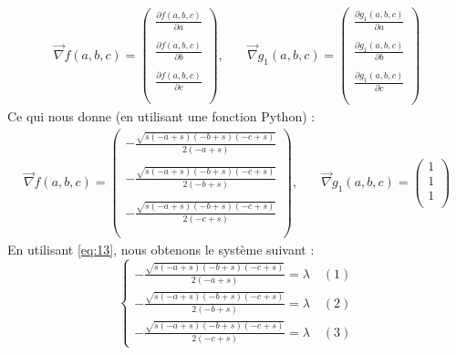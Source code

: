 \documentclass[12pt]{report}
\begin{document}
\begin{align*}
\overrightarrow{\nabla}f(a,b,c) = 
\left(\begin{matrix}
\frac{\partial f(a,b,c)}{\partial a} \\ \\
\frac{\partial f(a,b,c)}{\partial b} \\ \\
\frac{\partial f(a,b,c)}{\partial c} \\ \\
\end{matrix}\right),\quad          &  \overrightarrow{\nabla}g_{1}(a,b,c) = 
\left(\begin{matrix}
\frac{\partial g_{1}(a,b,c)}{\partial a} \\ \\
\frac{\partial g_{1}(a,b,c)}{\partial b} \\ \\
\frac{\partial g_{1}(a,b,c)}{\partial c} \\ \\
\end{matrix}\right)      
\end{align*}
\indent Ce qui nous donne (en utilisant une fonction Python) :
\begin{align*}
\overrightarrow{\nabla}f(a,b,c) = 
\left(\begin{matrix}
- \frac{\sqrt{s \left(- a + s\right) \left(- b + s\right) \left(- c + s\right)}}{2 \left(- a + s\right)}\\ \\
- \frac{\sqrt{s \left(- a + s\right) \left(- b + s\right) \left(- c + s\right)}}{2 \left(- b + s\right)}\\ \\
- \frac{\sqrt{s \left(- a + s\right) \left(- b + s\right) \left(- c + s\right)}}{2 \left(- c + s\right)} \\ \\
\end{matrix}\right),\quad          &  \overrightarrow{\nabla}g_{1}(a,b,c) = 
\left(\begin{matrix}
1 \\ 
1 \\ 
1 \\ 
\end{matrix}\right)      
\end{align*}
En utilisant \eqref{eq:13}, nous obtenons le système suivant :
\begin{equation}
\begin{cases} - \frac{\sqrt{s \left(- a + s\right) \left(- b + s\right) \left(- c + s\right)}}{2 \left(- a + s\right)} = \lambda \quad (1)\\
- \frac{\sqrt{s \left(- a + s\right) \left(- b + s\right) \left(- c + s\right)}}{2 \left(- b + s\right)} = \lambda \quad (2) \\
- \frac{\sqrt{s \left(- a + s\right) \left(- b + s\right) \left(- c + s\right)}}{2 \left(- c + s\right)} = \lambda 
\quad (3) \end{cases}
\end{equation}
\end{document}
